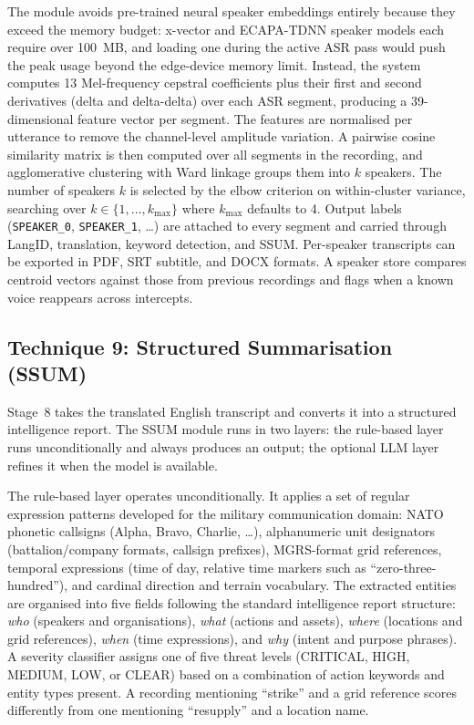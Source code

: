 \documentclass[conference]{IEEEtran}
\begin{document}
The module avoids pre-trained neural speaker embeddings entirely because they exceed the memory budget: x-vector and ECAPA-TDNN speaker models each require over 100~MB, and loading one during the active ASR pass would push the peak usage beyond the edge-device memory limit. Instead, the system computes 13 Mel-frequency cepstral coefficients plus their first and second derivatives (delta and delta-delta) over each ASR segment, producing a 39-dimensional feature vector per segment. The features are normalised per utterance to remove the channel-level amplitude variation. A pairwise cosine similarity matrix is then computed over all segments in the recording, and agglomerative clustering with Ward linkage groups them into $k$ speakers. The number of speakers $k$ is selected by the elbow criterion on within-cluster variance, searching over $k \in \{1, \ldots, k_{\max}\}$ where $k_{\max}$ defaults to 4. Output labels (\texttt{SPEAKER\_0}, \texttt{SPEAKER\_1}, \ldots) are attached to every segment and carried through LangID, translation, keyword detection, and SSUM. Per-speaker transcripts can be exported in PDF, SRT subtitle, and DOCX formats. A speaker store compares centroid vectors against those from previous recordings and flags when a known voice reappears across intercepts.

\subsection{Technique 9: Structured Summarisation (SSUM)}
\label{sec:isum}

Stage~8 takes the translated English transcript and converts it into a structured intelligence report. The SSUM module runs in two layers: the rule-based layer runs unconditionally and always produces an output; the optional LLM layer refines it when the model is available.

The rule-based layer operates unconditionally. It applies a set of regular expression patterns developed for the military communication domain: NATO phonetic callsigns (Alpha, Bravo, Charlie, \ldots), alphanumeric unit designators (battalion/company formats, callsign prefixes), MGRS-format grid references, temporal expressions (time of day, relative time markers such as ``zero-three-hundred''), and cardinal direction and terrain vocabulary. The extracted entities are organised into five fields following the standard intelligence report structure: \textit{who} (speakers and organisations), \textit{what} (actions and assets), \textit{where} (locations and grid references), \textit{when} (time expressions), and \textit{why} (intent and purpose phrases). A severity classifier assigns one of five threat levels (CRITICAL, HIGH, MEDIUM, LOW, or CLEAR) based on a combination of action keywords and entity types present. A recording mentioning ``strike'' and a grid reference scores differently from one mentioning ``resupply'' and a location name.
\end{document}
